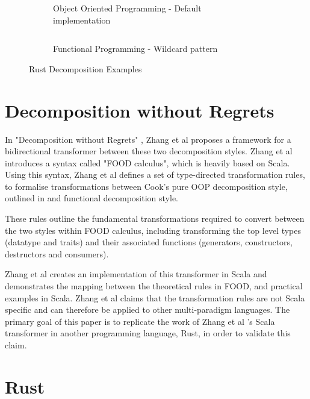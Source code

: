 \documentclass[ oneside,%
                    author={James Elgar},
                    degree={MEng},
                     title={Bidirectional transformer between functional and \\ object-oriented programming in Rust},
                  subtitle={}]{dissertation}
\newcommand{\weixin}{Zhang et al }
\newcommand{\codefile}[2]{\inputminted[xleftmargin=20pt,linenos, breaklines]{#1}{#2}}
\newcommand{\rustfile}[1]{\codefile{rust}{../#1.rs}}
\newcommand{\rustexample}[1]{\rustfile{examples/src/#1}}
\begin{document}
\begin{figure}
\centering
\begin{subfigure}{.5\textwidth}
    \rustexample{shape2/oop}
    \caption{Object Oriented Programming - Default implementation}
    \label{fig:inheritance-example-oop}
\end{subfigure}%
\begin{subfigure}{.5\textwidth}
    \rustexample{shape2/fp}
    \caption{Functional Programming - Wildcard pattern}
    \label{fig:inheritance-example-fp}
\end{subfigure}
\caption{Rust Decomposition Examples}
\label{fig:inheritance-example}
\end{figure}

\section{Decomposition without Regrets}

In "Decomposition without Regrets" \cite{food}, \weixin proposes a framework for a bidirectional transformer between these two decomposition styles. \weixin introduces a syntax called "FOOD calculus", which is heavily based on Scala. Using this syntax, \weixin defines a set of type-directed transformation rules, to formalise transformations between Cook's pure OOP decomposition style, outlined in \cite{food} and functional decomposition style.

These rules outline the fundamental transformations required to convert between the two styles within FOOD calculus, including transforming the top level types (datatype and traits) and their associated functions (generators, constructors, destructors and consumers).


\weixin creates an implementation of this transformer in Scala and demonstrates the mapping between the theoretical rules in FOOD, and practical examples in Scala.
\weixin claims that the transformation rules are not Scala specific and can therefore be applied to other multi-paradigm languages. The primary goal of this paper is to replicate the work of \weixin's Scala transformer in another programming language, Rust, in order to validate this claim.



\section{Rust}
\end{document}

